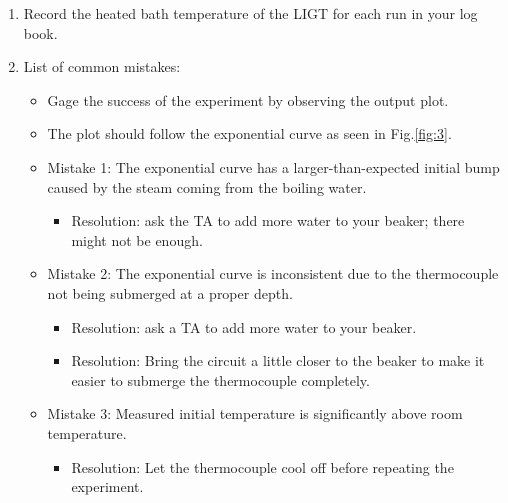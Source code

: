 \documentclass{article} %
\begin{document}
\begin{enumerate}
\begin{itemize}
        \begin{itemize}
            \item \texttt{XX} indicates the current dynamic measurement.
        \end{itemize}
        \item Update the file name before each run to avoid overwriting data.
        \item Repeat for three successful runs. (review ``List of common mistakes" to determine success of the run) 
        \item Ensure that the thermocouple reaches room temperature before repeating the steps.
    \end{itemize}
    \item Record the heated bath temperature of the LIGT for each run in your log book.
    \item List of common mistakes:
    \begin{itemize}
        \item Gage the success of the experiment by observing the output plot.
        \item The plot should follow the exponential curve as seen in Fig.\ref{fig:3}.
        \item Mistake 1: The exponential curve has a larger-than-expected initial bump caused by the steam coming from the boiling water.
        \begin{itemize}
            \item Resolution: ask the TA to add more water to your beaker; there might not be enough.
        \end{itemize}
        \item Mistake 2: The exponential curve is inconsistent due to the thermocouple not being submerged at a proper depth.
        \begin{itemize}
            \item Resolution: ask a TA to add more water to your beaker.
            \item Resolution: Bring the circuit a little closer to the beaker to make it easier to submerge the thermocouple completely.
        \end{itemize}
        \item Mistake 3: Measured initial temperature is significantly above room temperature.
        \begin{itemize}
            \item Resolution: Let the thermocouple cool off before repeating the experiment.
        \end{itemize}

\end{itemize}
\end{enumerate}
\end{document}
